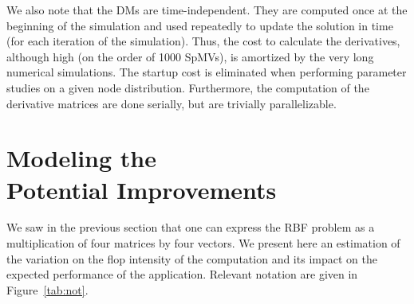 \documentclass{sig-alternate}
\def\ee#1{{#1}}
\def\ger#1{#1}
\begin{document}
We also note that the DMs are time-independent. They are computed once \ee{at the beginning of the simulation} and used repeatedly to update the solution 
in time (for each iteration of the simulation). Thus, the cost to calculate the derivatives, although high \ger{(on the order of 1000 SpMVs)}, 
is amortized by the very long numerical simulations. \ger{The startup cost is eliminated when performing parameter studies on a given node distribution. Furthermore, the computation of the derivative matrices are done serially, but are trivially parallelizable.}


\section{Modeling the\\ Potential Improvements}
\label{sec:model}

We saw in the previous section that one can express the RBF problem as
a multiplication of four matrices by four vectors. We present here an
estimation of the variation on the flop intensity of the computation
and its impact on the expected performance of the
application. Relevant notation are given in Figure~\ref{tab:not}.
\end{document}
